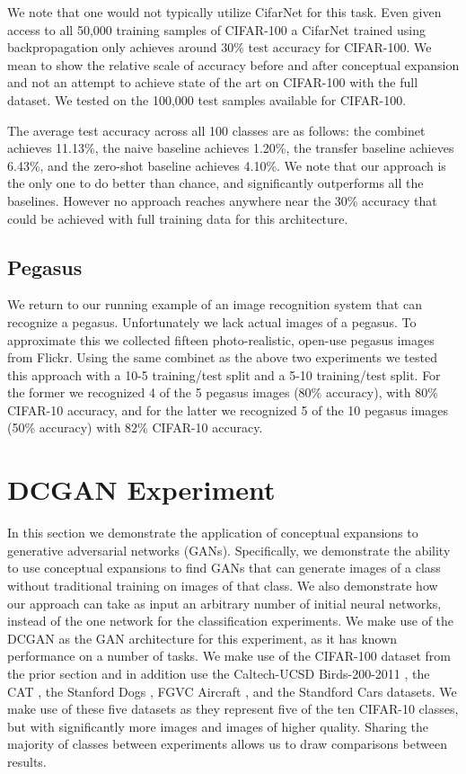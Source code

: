 \documentclass[letterpaper]{article}
\begin{document}
We note that one would not typically utilize CifarNet for this task. 
Even given access to all 50,000 training samples of CIFAR-100 a CifarNet trained using backpropagation only achieves around 30\% test accuracy for CIFAR-100. 
We mean to show the relative scale of accuracy before and after conceptual expansion and not an attempt to achieve state of the art on CIFAR-100 with the full dataset. We tested on the 100,000 test samples available for CIFAR-100.

The average test accuracy across all 100 classes are as follows: the combinet achieves 11.13\%, the naive baseline achieves 1.20\%, the transfer baseline achieves 6.43\%, and the zero-shot baseline achieves 4.10\%. We note that our approach is the only one to do better than chance, and significantly outperforms all the baselines. However no approach reaches anywhere near the 30\% accuracy that could be achieved with full training data for this architecture. 

\subsection{Pegasus}

We return to our running example of an image recognition system that can recognize a pegasus. Unfortunately we lack actual images of a pegasus. To approximate this we collected fifteen photo-realistic, open-use pegasus images from Flickr. Using the same combinet as the above two experiments we tested this approach with a 10-5 training/test split and a 5-10 training/test split. For the former we recognized 4 of the 5 pegasus images (80\% accuracy), with 80\% CIFAR-10 accuracy, and for the latter we recognized 5 of the 10 pegasus images (50\% accuracy) with 82\% CIFAR-10 accuracy. 

\section{DCGAN Experiment}

In this section we demonstrate the application of conceptual expansions to generative adversarial networks (GANs). 
Specifically, we demonstrate the ability to use conceptual expansions to find GANs that can generate images of a class without traditional training on images of that class. 
We also demonstrate how our approach can take as input an arbitrary number of initial neural networks, instead of the one network for the classification experiments. 
We make use of the DCGAN \cite{radford2015unsupervised} as the GAN architecture for this experiment, as it has known performance on a number of tasks.  
We make use of the CIFAR-100 dataset from the prior section and in addition use the Caltech-UCSD Birds-200-2011 \cite{WahCUB_200_2011}, the CAT \cite{zhang2008cat}, the Stanford Dogs \cite{KhoslaYaoJayadevaprakashFeiFei_FGVC2011}, FGVC Aircraft \cite{maji13fine-grained}, and the Standford Cars \cite{KrauseStarkDengFei-Fei_3DRR2013} datasets. We make use of these five datasets as they represent five of the ten CIFAR-10 classes, but with significantly more images and images of higher quality. Sharing the majority of classes between experiments allows us to draw comparisons between results.
\end{document}
